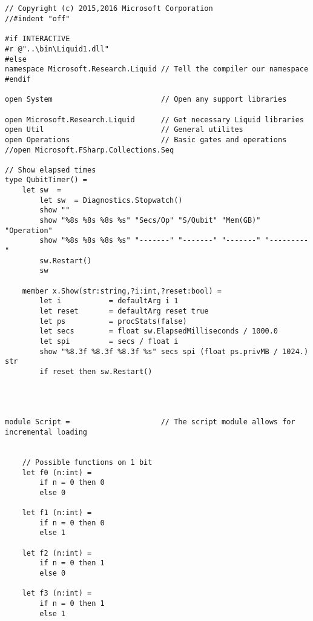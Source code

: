 \documentclass{article}
\theoremstyle{plain}
\theoremstyle{definition}
\theoremstyle{remark}
\begin{document}
\begin{verbatim}


// Copyright (c) 2015,2016 Microsoft Corporation
//#indent "off"

#if INTERACTIVE
#r @"..\bin\Liquid1.dll"
#else
namespace Microsoft.Research.Liquid // Tell the compiler our namespace
#endif

open System                         // Open any support libraries

open Microsoft.Research.Liquid      // Get necessary Liquid libraries
open Util                           // General utilites
open Operations                     // Basic gates and operations
//open Microsoft.FSharp.Collections.Seq

// Show elapsed times
type QubitTimer() =
    let sw  =
        let sw  = Diagnostics.Stopwatch()
        show ""
        show "%8s %8s %8s %s" "Secs/Op" "S/Qubit" "Mem(GB)" "Operation"
        show "%8s %8s %8s %s" "-------" "-------" "-------" "---------"
        sw.Restart()
        sw

    member x.Show(str:string,?i:int,?reset:bool) =
        let i           = defaultArg i 1
        let reset       = defaultArg reset true
        let ps          = procStats(false)
        let secs        = float sw.ElapsedMilliseconds / 1000.0
        let spi         = secs / float i
        show "%8.3f %8.3f %8.3f %s" secs spi (float ps.privMB / 1024.) str
        if reset then sw.Restart()




module Script =                     // The script module allows for incremental loading


    // Possible functions on 1 bit
    let f0 (n:int) = 
        if n = 0 then 0
        else 0

    let f1 (n:int) = 
        if n = 0 then 0
        else 1

    let f2 (n:int) = 
        if n = 0 then 1
        else 0

    let f3 (n:int) = 
        if n = 0 then 1
        else 1


\end{verbatim}
\end{document}
